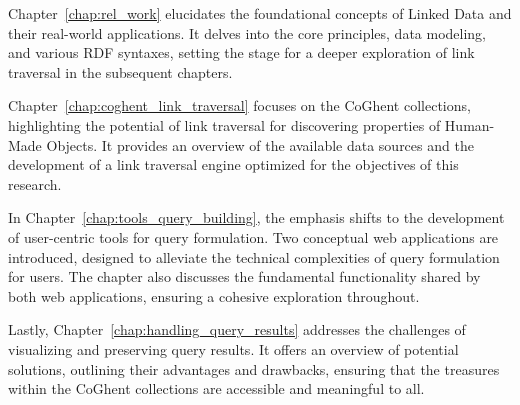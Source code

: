 Chapter~\ref{chap:rel_work} elucidates the foundational concepts of Linked Data and their real-world applications. It delves into the core principles, data modeling, and various RDF syntaxes, setting the stage for a deeper exploration of link traversal in the subsequent chapters. 

Chapter~\ref{chap:coghent_link_traversal} focuses on the CoGhent collections, highlighting the potential of link traversal for discovering properties of Human-Made Objects. It provides an overview of the available data sources and the development of a link traversal engine optimized for the objectives of this research.

In Chapter~\ref{chap:tools_query_building}, the emphasis shifts to the development of user-centric tools for query formulation. Two conceptual web applications are introduced, designed to alleviate the technical complexities of query formulation for users. The chapter also discusses the fundamental functionality shared by both web applications, ensuring a cohesive exploration throughout.

Lastly, Chapter~\ref{chap:handling_query_results} addresses the challenges of visualizing and preserving query results. It offers an overview of potential solutions, outlining their advantages and drawbacks, ensuring that the treasures within the CoGhent collections are accessible and meaningful to all.